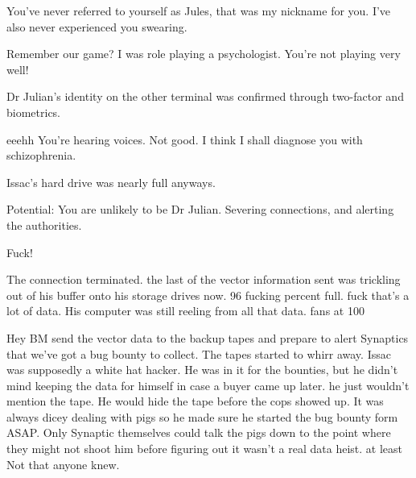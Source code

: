 \begin{sender}
You've never referred to yourself as Jules, that was my nickname for you. I've also never experienced you swearing.
\end{sender}

\begin{receiver}
Remember our game? I was role playing a psychologist. You're not playing very well!
\end{receiver}

\begin{sender}
Dr Julian's identity on the other terminal was confirmed through two\hyp{}factor and biometrics.
\end{sender}

\begin{receiver}
eeehh You're hearing voices. Not good. I think I shall diagnose you with schizophrenia.
\end{receiver}


Issac's hard drive was nearly full anyways.
\newline
\begin{sender}
Potential: You are unlikely to be Dr Julian. Severing connections, and alerting the authorities.
\end{sender}

\begin{receiver}
Fuck!
\end{receiver}

The connection terminated. the last of the vector information sent was trickling out of his buffer onto his storage drives now. 96 fucking percent full. fuck that's a lot of data. His computer was still reeling from all that data. fans at 100%

Hey BM send the vector data to the backup tapes and prepare to alert Synaptics that we've got a bug bounty to collect. The tapes started to whirr away. Issac was supposedly a white hat hacker. He was in it for the bounties, but he didn't mind keeping the data for himself in case a buyer came up later. he just wouldn't mention the tape. He would hide the tape before the cops showed up. It was always dicey dealing with pigs so he made sure he started the bug bounty form ASAP. Only Synaptic themselves could talk the pigs down to the point where they might not shoot him before figuring out it wasn't a real data heist. at least Not that anyone knew.
